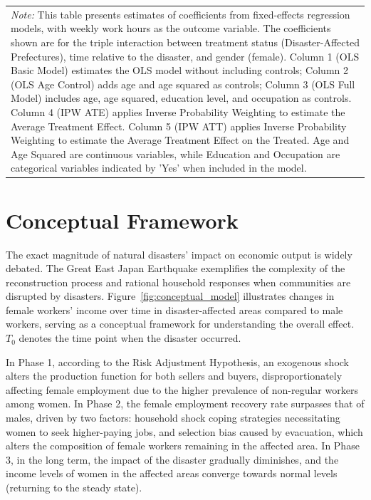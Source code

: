 \documentclass[a4paper,12pt]{article}
\begin{document}
\begin{table}[htbp]
{\begin{tabular}{@{\extracolsep{5pt}}lccccc}
\multicolumn{6}{p{1.50\linewidth}}{\footnotesize \textit{Note:} This table presents estimates of coefficients from fixed-effects regression models, with weekly work hours as the outcome variable. The coefficients shown are for the triple interaction between treatment status (Disaster-Affected Prefectures), time relative to the disaster, and gender (female). Column 1 (OLS Basic Model) estimates the OLS model without including controls; Column 2 (OLS Age Control) adds age and age squared as controls; Column 3 (OLS Full Model) includes age, age squared, education level, and occupation as controls. Column 4 (IPW ATE) applies Inverse Probability Weighting to estimate the Average Treatment Effect. Column 5 (IPW ATT) applies Inverse Probability Weighting to estimate the Average Treatment Effect on the Treated. Age and Age Squared are continuous variables, while Education and Occupation are categorical variables indicated by 'Yes' when included in the model.}\\
\end{tabular}
}

\label{table:weekly_work_hours}


\end{table}



\newpage


\section{Conceptual Framework}

The exact magnitude of natural disasters' impact on economic output is widely debated. The Great East Japan Earthquake exemplifies the complexity of the reconstruction process and rational household responses when communities are disrupted by disasters. Figure~\ref{fig:conceptual_model} illustrates changes in female workers' income over time in disaster-affected areas compared to male workers, serving as a conceptual framework for understanding the overall effect. $T_{0}$ denotes the time point when the disaster occurred.

In Phase 1, according to the Risk Adjustment Hypothesis, an exogenous shock alters the production function for both sellers and buyers, disproportionately affecting female employment due to the higher prevalence of non-regular workers among women. In Phase 2, the female employment recovery rate surpasses that of males, driven by two factors: household shock coping strategies necessitating women to seek higher-paying jobs, and selection bias caused by evacuation, which alters the composition of female workers remaining in the affected area. In Phase 3, in the long term, the impact of the disaster gradually diminishes, and the income levels of women in the affected areas converge towards normal levels (returning to the steady state).
\end{document}
